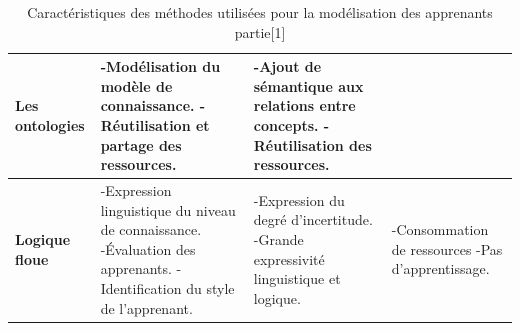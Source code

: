\begin{table}[!htbp]
\begin{tabular}{|m{3cm}|m{4cm}|m{4cm}|m{4cm}|}
	  \textbf{Les ontologies}  &
	  -Modélisation du modèle de connaissance. \newline
	  -Réutilisation et partage des ressources.&
	  -Ajout de sémantique aux relations entre concepts. \newline
	  -Réutilisation des ressources.&  \\ \hline
	  \textbf{Logique floue}  &
	  -Expression linguistique du niveau de connaissance. \newline
	  -Évaluation des apprenants.\newline
	  -Identification du style de l'apprenant.&
	  -Expression du degré d'incertitude. \newline
	  -Grande expressivité linguistique et logique.&
	  -Consommation de ressources \newline
	  -Pas d'apprentissage. \\ \hline
	\end{tabular}
	\caption{Caractéristiques des méthodes utilisées pour la modélisation des apprenants partie[1]}
	\label{Caracteristiques_modelisation_apprenants1}
\end{table}

